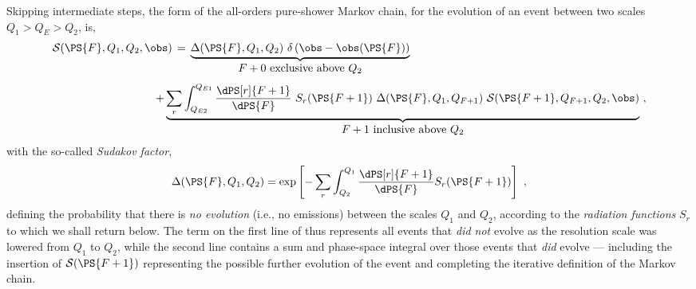 Skipping intermediate steps, the form of the all-orders pure-shower
Markov chain, for the evolution of an event between two scales $Q_{1}
> Q_E > Q_{2}$, is,  
\begin{equation}\begin{array}{rcl}
\displaystyle \hspace*{-1mm} {\cal S}(\PS{F},Q_{1},Q_{2},\obs) \hspace*{-1mm}
&  \hspace*{-1mm}= \hspace*{-1mm} &\displaystyle \hspace*{-1mm}
  \underbrace{
\Delta(\PS{F},Q_{1},Q_{2})\ 
\delta\left(\obs-\obs(\PS{F})\right) 
}_{\mbox{$F+0$ exclusive above $Q_{2}$}}\\[9mm]
& & \hspace*{-1.2cm}+ \displaystyle 
\underbrace{
\sum_r \int_{Q_{E2}}^{Q_{E1}}
\frac{\dPS[r]{F+1}}{\dPS{F}} 
\ S_r(\PS{F+1}) \ \Delta(\PS{F},Q_{1},Q_{F+1})
 \ {\cal S}(\PS{F+1},Q_{F+1},Q_{2},\obs)}_{\mbox{$F+1$ inclusive above $Q_{2}$}}
~,\label{eq:markov} \hspace*{-1mm}
\end{array}
\end{equation}
with the so-called \emph{Sudakov factor},
\begin{equation} 
\Delta(\PS{F},Q_{1},Q_{2}) = \exp\left[-\sum_r\int_{Q_{2}}^{Q_{1}} 
\frac{\dPS[r]{F+1}}{\dPS{F}} S_r(\PS{F+1}) \right]~, \label{eq:sudakov}
\end{equation}
defining the probability that there is \emph{no evolution} (i.e., no
emissions) between the scales $Q_{1}$ and $Q_{2}$, according to the
\emph{radiation functions} $S_r$ to which we shall return below. 
\index{Markov chains}
The term on the first line of
 thus represents all events that \emph{did not}
evolve as the resolution scale was lowered from $Q_{1}$ to $Q_{2}$,
while the second line contains a sum and phase-space integral over
those events that \emph{did} evolve --- including the insertion of ${\cal
  S}(\PS{F+1})$ representing the possible further evolution of the
event and completing the iterative definition of the Markov chain. 

